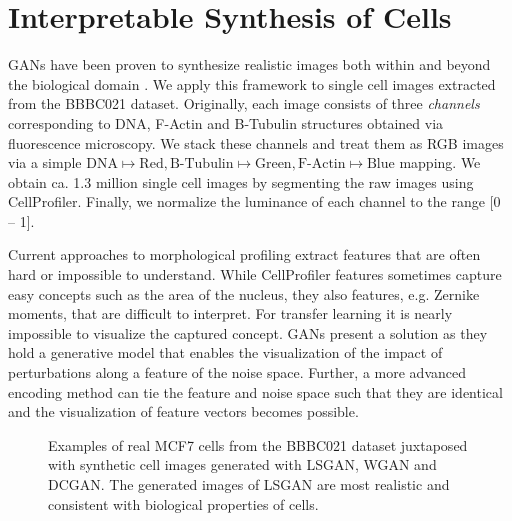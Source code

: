 \documentclass{article}
\begin{document}
\section{Interpretable Synthesis of Cells}\label{synthesis}

GANs have been proven to synthesize realistic images both within and beyond the
biological domain
\cite{goodfellow2014generative,radford2015unsupervised,osokin2017gans}. We apply
this framework to single cell images extracted from the BBBC021 dataset.
Originally, each image consists of three \emph{channels} corresponding to DNA,
F-Actin and B-Tubulin structures obtained via fluorescence microscopy. We stack
these channels and treat them as RGB images via a simple $\text{DNA} \mapsto
\text{Red}, \text{B-Tubulin} \mapsto \text{Green}, \text{F-Actin} \mapsto
\text{Blue}$ mapping. We obtain ca. 1.3 million single cell images by segmenting
the raw images using CellProfiler. Finally, we normalize the
luminance of each channel to the range [0 -- 1].

Current approaches to morphological profiling extract features that are often
hard or impossible to understand. While CellProfiler features sometimes capture
easy concepts such as the area of the nucleus, they also features, e.g. Zernike
moments, that are difficult to interpret. For transfer learning it is nearly
impossible to visualize the captured concept. GANs present a solution as they
hold a generative model that enables the visualization of the impact of
perturbations along a feature of the noise space. Further, a more advanced
encoding method can tie the feature and noise space such that they are identical
and the visualization of feature vectors becomes possible.

\begin{figure}
  \centering
  \caption{Examples of real MCF7 cells from the BBBC021 dataset juxtaposed with synthetic cell images generated with LSGAN, WGAN and DCGAN. The generated images of LSGAN are most realistic and consistent with biological properties of cells.}
  \label{fig:generated}
\end{figure}
\end{document}
